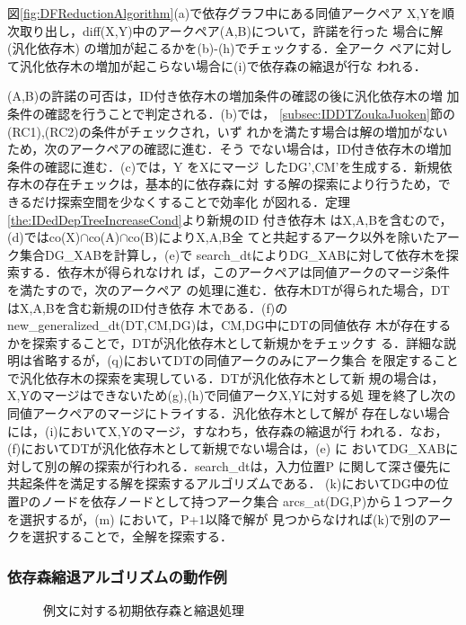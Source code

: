 図\ref{fig:DFReductionAlgorithm}(a)で依存グラフ中にある同値アークペア
X,Yを順次取り出し，diff(X,Y)中のアークペア(A,B)について，許諾を行った
場合に解(汎化依存木) の増加が起こるかを(b)-(h)でチェックする．全アーク
ペアに対して汎化依存木の増加が起こらない場合に(i)で依存森の縮退が行な
われる．

(A,B)の許諾の可否は，ID付き依存木の増加条件の確認の後に汎化依存木の増
加条件の確認を行うことで判定される．(b)では，
\ref{subsec:IDDTZoukaJuoken}節の(RC1),(RC2)の条件がチェックされ，いず
れかを満たす場合は解の増加がないため，次のアークペアの確認に進む．そう
でない場合は，ID付き依存木の増加条件の確認に進む．(c)では，Y をXにマージ
したDG',CM'を生成する．新規依存木の存在チェックは，基本的に依存森に対
する解の探索により行うため，できるだけ探索空間を少なくすることで効率化
が図れる．定理\ref{the:IDedDepTreeIncreaseCond}より新規のID 付き依存木
はX,A,Bを含むので，(d)ではco(X)${\cap}$co(A)${\cap}$co(B)によりX,A,B全
てと共起するアーク以外を除いたアーク集合DG\_XABを計算し，(e)で
search\_dtによりDG\_XABに対して依存木を探索する．依存木が得られなけれ
ば，このアークペアは同値アークのマージ条件を満たすので，次のアークペア
の処理に進む．依存木DTが得られた場合，DTはX,A,Bを含む新規のID付き依存
木である．(f)のnew\_generalized\_dt(DT,CM,DG)は，CM,DG中にDTの同値依存
木が存在するかを探索することで，DTが汎化依存木として新規かをチェックす
る．詳細な説明は省略するが，(q)においてDTの同値アークのみにアーク集合
を限定することで汎化依存木の探索を実現している．DTが汎化依存木として新
規の場合は，X,Yのマージはできないため(g),(h)で同値アークX,Yに対する処
理を終了し次の同値アークペアのマージにトライする．汎化依存木として解が
存在しない場合には，(i)においてX,Yのマージ，すなわち，依存森の縮退が行
われる．なお，(f)においてDTが汎化依存木として新規でない場合は，(e) に
おいてDG\_XABに対して別の解の探索が行われる．search\_dtは，入力位置P 
に関して深さ優先に共起条件を満足する解を探索するアルゴリズムである．
(k)においてDG中の位置Pのノードを依存ノードとして持つアーク集合
arcs\_at(DG,P)から１つアークを選択するが，(m) において，P+1以降で解が
見つからなければ(k)で別のアークを選択することで，全解を探索する．

\subsubsection{依存森縮退アルゴリズムの動作例}

\begin{figure}[b]
 \begin{center}
 \end{center}
\myfiglabelskip
\caption{例文に対する初期依存森と縮退処理}
\label{fig:IDFandRDFexample}
\end{figure}

